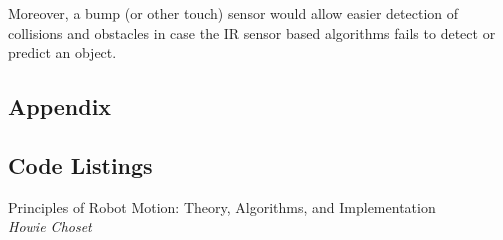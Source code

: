 \documentclass[11pt, a4paper]{article}
\begin{document}
Moreover, a bump (or other touch) sensor would allow easier detection of collisions and 
obstacles in case the IR sensor based algorithms fails to detect or predict an object.



\begin{appendices}
\section*{Appendix}
\subsection{Code Listings}



\end{appendices}


\begin{thebibliography}{1}

Principles of Robot Motion: Theory, Algorithms, and Implementation\\
\textit{Howie Choset}

\end{thebibliography}
\end{document}
